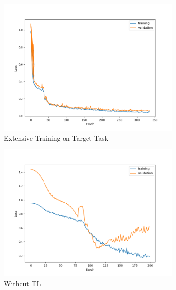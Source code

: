 \begin{figure}[ht!]
    \centering
    \begin{subfigure}{0.48\textwidth}
        \includegraphics[width=\textwidth]{./project3/figures/figure1a.png}
        \caption{Extensive Training on Target Task} 
        \label{subfig3-1:extensive}
    \end{subfigure}\hfill
    \begin{subfigure}{0.48\textwidth}
        \includegraphics[width=\textwidth]{./project3/figures/figure1b.png}
        \caption{Without TL}
        \label{subfig3-1:without}
    \end{subfigure}
    \begin{subfigure}{0.48\textwidth}

\end{subfigure}
\end{figure}
